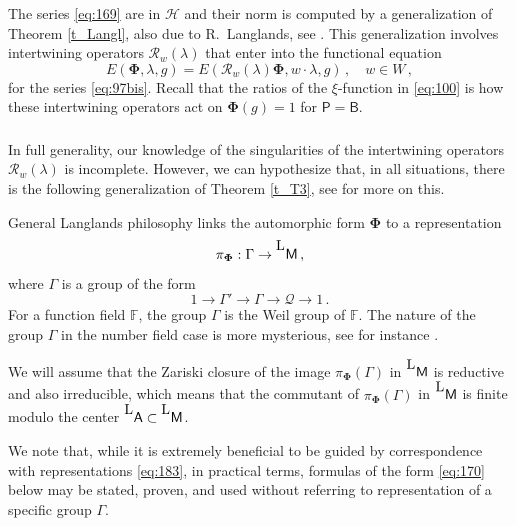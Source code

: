 \documentclass[14pt]{extarticle}
\newcommand{\F}{\mathbb{F}}
\newcommand{\bA}{\mathsf{A}}
\newcommand{\sP}{\mathsf{P}}
\newcommand{\bM}{\mathsf{M}}
\newcommand{\bB}{\mathsf{B}}
\newcommand{\cR}{\mathscr{R}}
\newcommand{\cQ}{\mathscr{Q}}
\newcommand{\La}{{}^{\raisebox{2pt}{\textup{\tiny\textsf{L}}}}}
\newcommand{\bPhi}{\boldsymbol{\Phi}}
\newcommand{\cH}{\mathscr{H}}
\theoremstyle{definition}
\begin{document}
The series \eqref{eq:169} are in $\cH$ and their norm is computed by a generalization of Theorem \ref{t_Langl}, also due
to R.~Langlands, see \cite{L, Labesse}. This generalization  
involves intertwining operators $\cR_w(\lambda)$
that enter into the functional equation 
%
\begin{equation}
E(\bPhi, \lambda,g) = E(\cR_w(\lambda) \bPhi, w \cdot 
\lambda,g)\,, \quad w \in W\,, \label{eq:168}
\end{equation}
%
for the series \eqref{eq:97bis}. Recall that the ratios of the
$\xi$-function in \eqref{eq:100} is how these intertwining
operators act on 
$\bPhi(g)=1$ for $\sP=\bB$.

\subsubsection{}

In full generality, our knowledge of the singularities of the
intertwining operators $\cR_w(\lambda)$ is incomplete. However,
we can hypothesize that, in all situations, there is the following
generalization of Theorem \ref{t_T3}, see \cites{KO,KO2} for
more on this. 

General Langlands philosophy links the automorphic form $\bPhi$ to
a representation
%
\begin{equation}
\pi_{\bPhi}: \Gamma \to \La \bM \,, \label{eq:183}
\end{equation}
%
where $\Gamma$ is a group of the
form
\[
  1 \to \Gamma' \to \Gamma \to \cQ\to 1\,. 
\]
%
For a
function field $\F$, the group
$\Gamma$ is the Weil group of $\F$. The nature of the group $\Gamma$
in the number field case is more mysterious, see for instance
\cite{Lmarch}.

We will assume that the Zariski closure of the image 
$\pi_{\bPhi}(\Gamma)$ in $ \La \bM$ is reductive and also
irreducible, which means that the commutant of $\pi_{\bPhi}(\Gamma)$ in $\La \bM$ is finite
modulo the center $\La \bA \subset \La \bM$.

We note that, while it is extremely beneficial to be guided by correspondence with
representations \eqref{eq:183},  in practical terms, formulas of the form \eqref{eq:170} below may be stated,
proven, and used without referring to representation of a specific
group $\Gamma$. 

\subsubsection{}
\end{document}
